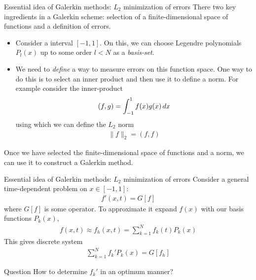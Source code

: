 \documentclass[aspectratio=169]{beamer}
\newcommand{\mypause}{}
\begin{document}
\begin{frame}{Essential idea of Galerkin methods: $L_2$ minimization
    of errors}
  \small%
  There two key ingredients in a Galerkin scheme: selection of a
  finite-dimensional space of functions and a definition of errors.
  \mypause%

  \begin{itemize}\small
  \item Consider a interval $[-1,1]$. On this, we can choose Legendre
    polynomials $P_l(x)$ up to some order $l<N$ as a \emph{basis-set}.
  \item We need to \emph{define} a way to measure errors on this
    function space. One way to do this is to select an inner product
    and then use it to define a norm. For example consider the
    inner-product
    \begin{align*}
      (f,g) = \int_{-1}^1 f(x) g(x) \thinspace dx
    \end{align*}
    using which we can define the $L_2$ norm
    \begin{align*}
      \| f \|_2 = (f, f)
    \end{align*}
  \end{itemize}
  Once we have selected the finite-dimensional space of functions and
  a norm, we can use it to construct a Galerkin method.
  
\end{frame}


\begin{frame}{Essential idea of Galerkin methods: $L_2$ minimization
    of errors}
  \small
  Consider a general time-dependent problem on $x\in [-1,1]$:
  \begin{align*}
    f'(x,t) = G[f]
  \end{align*}
  where $G[f]$ is some operator. To approximate it expand $f(x)$ with
  our basis functions $P_k(x)$,
  \begin{align*}
    f(x,t) \approx f_h(x,t)  = \sum_{k=1}^N f_k(t) P_k(x)
  \end{align*}
  This gives discrete system
  \begin{align*}
    \sum_{k=1}^N f_k' P_k(x) = G[f_h]
  \end{align*}
  \mypause
  \begin{block}{Question}
    How to determine $f_k'$ in an optimum manner?
  \end{block}
  
\end{frame}
\end{document}
